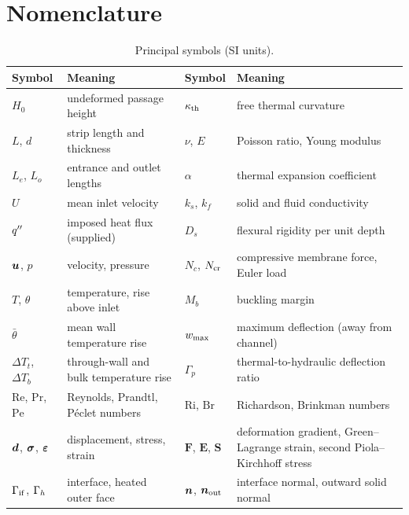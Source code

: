 \section{Nomenclature}
\label{app:symbols}
\begin{table}[h]
\centering\small
\caption{Principal symbols (SI units).}
\label{tab:symbols}
\begin{tabular}{@{}p{2.0cm}p{5.1cm}p{2.0cm}p{5.1cm}@{}}
\toprule
Symbol & Meaning & Symbol & Meaning \\
\midrule
$H_0$ & undeformed passage height & $\kappa_{\mathrm{th}}$ & free thermal curvature \\
$L$, $d$ & strip length and thickness & $\nu$, $E$ & Poisson ratio, Young modulus \\
$L_e$, $L_o$ & entrance and outlet lengths & $\alpha$ & thermal expansion coefficient \\
$U$ & mean inlet velocity & $k_s$, $k_f$ & solid and fluid conductivity \\
$q^{\prime\prime}$ & imposed heat flux (supplied) & $D_s$ & flexural rigidity per unit depth \\
$\bm{u}$, $p$ & velocity, pressure & $N_c$, $N_{\mathrm{cr}}$ & compressive membrane force, Euler load \\
$T$, $\theta$ & temperature, rise above inlet & $M_b$ & buckling margin \\
$\bar\theta$ & mean wall temperature rise & $w_{\max}$ & maximum deflection (away from channel) \\
$\Delta T_t$, $\Delta T_b$ & through-wall and bulk temperature rise & $\Gamma_p$ & thermal-to-hydraulic deflection ratio \\
$\mathrm{Re}$, $\mathrm{Pr}$, $\mathrm{Pe}$ & Reynolds, Prandtl, P\'eclet numbers & $\mathrm{Ri}$, $\mathrm{Br}$ & Richardson, Brinkman numbers \\
$\bm{d}$, $\bm{\sigma}$, $\bm{\varepsilon}$ & displacement, stress, strain & $\bm F$, $\bm E$, $\bm S$ & deformation gradient, Green--Lagrange strain, second Piola--Kirchhoff stress \\
$\Gamma_{\mathrm{if}}$, $\Gamma_h$ & interface, heated outer face & $\bm{n}$, $\bm{n}_{\mathrm{out}}$ & interface normal, outward solid normal \\
\bottomrule
\end{tabular}
\end{table}
